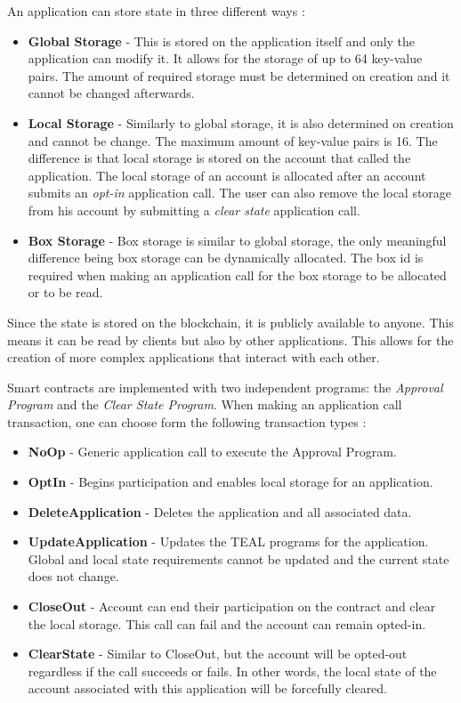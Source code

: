 An application can store state in three different ways \cite{noauthor_contract_nodate}:
\begin{itemize}
    \item \textbf{Global Storage} - This is stored on the application itself and only the application can modify it. It allows for the storage of up to 64 key-value pairs. The amount of required storage must be determined on creation and it cannot be changed afterwards.
    \item \textbf{Local Storage} - Similarly to global storage, it is also determined on creation and cannot be change. The maximum amount of key-value pairs is 16. The difference is that local storage is stored on the account that called the application. The local storage of an account is allocated after an account submits an \textit{opt-in} application call. The user can also remove the local storage from his account by submitting a \textit{clear state} application call.
    \item \textbf{Box Storage} - Box storage is similar to global storage, the only meaningful difference being box storage can be dynamically allocated. The box id is required when making an application call for the box storage to be allocated or to be read.
\end{itemize}
Since the state is stored on the blockchain, it is publicly available to anyone. This means it can be read by clients but also by other applications. This allows for the creation of more complex applications that interact with each other.

Smart contracts are implemented with two independent programs: the \textit{Approval Program} and the \textit{Clear State Program}. When making an application call transaction, one can choose form the following transaction types \cite{noauthor_overview_nodate}:
\begin{itemize}
    \item \textbf{NoOp} - Generic application call to execute the Approval Program.
    \item \textbf{OptIn} - Begins participation and enables local storage for an application.
    \item \textbf{DeleteApplication} - Deletes the application and all associated data.
    \item \textbf{UpdateApplication} - Updates the TEAL programs for the application. Global and local state requirements cannot be updated and the current state does not change.
    \item \textbf{CloseOut} - Account can end their participation on the contract and clear the local storage. This call can fail and the account can remain opted-in.
    \item \textbf{ClearState} - Similar to CloseOut, but the account will be opted-out regardless if the call succeeds or fails. In other words, the local state of the account associated with this application will be forcefully cleared.
\end{itemize}

